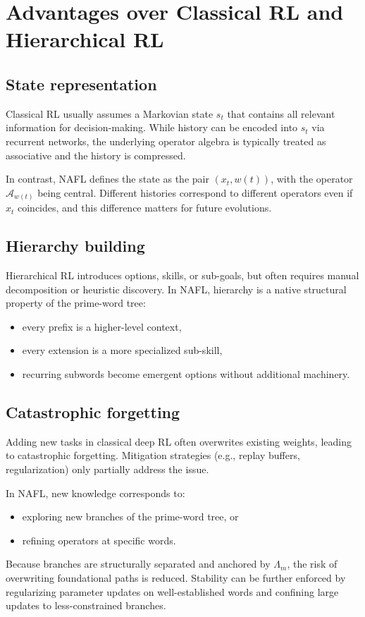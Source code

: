 \documentclass[11pt]{article}
\newcommand{\Acal}{\mathcal{A}}
\newcommand{\Lm}{\Lambda_m}
\newcommand{\Awt}{\Acal_{w(t)}}
\begin{document}
\section{Advantages over Classical RL and Hierarchical RL}

\subsection{State representation}

Classical RL usually assumes a Markovian state \(s_t\) that contains all relevant information for decision-making.
While history can be encoded into \(s_t\) via recurrent networks, the underlying operator algebra is typically treated as associative and the history is compressed.

In contrast, NAFL defines the state as the pair \((x_t, w(t))\), with the operator \(\Awt\) being central.
Different histories correspond to different operators even if \(x_t\) coincides, and this difference matters for future evolutions.

\subsection{Hierarchy building}

Hierarchical RL introduces options, skills, or sub-goals, but often requires manual decomposition or heuristic discovery.
In NAFL, hierarchy is a native structural property of the prime-word tree:
\begin{itemize}[nosep]
    \item every prefix is a higher-level context,
    \item every extension is a more specialized sub-skill,
    \item recurring subwords become emergent options without additional machinery.
\end{itemize}

\subsection{Catastrophic forgetting}

Adding new tasks in classical deep RL often overwrites existing weights, leading to catastrophic forgetting.
Mitigation strategies (e.g., replay buffers, regularization) only partially address the issue.

In NAFL, new knowledge corresponds to:
\begin{itemize}[nosep]
    \item exploring new branches of the prime-word tree, or
    \item refining operators at specific words.
\end{itemize}
Because branches are structurally separated and anchored by \(\Lm\), the risk of overwriting foundational paths is reduced.
Stability can be further enforced by regularizing parameter updates on well-established words and confining large updates to less-constrained branches.
\end{document}
